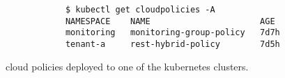 \documentclass[../main.tex]{subfiles}
\begin{document}
    \begin{figure}[h]
        \begin{verbatim}
            $ kubectl get cloudpolicies -A
            NAMESPACE    NAME                      AGE
            monitoring   monitoring-group-policy   7d7h
            tenant-a     rest-hybrid-policy        7d5h
        \end{verbatim}
        \captionsetup{justification=centering}
        \caption{
            \Gls{cloud} policies deployed to one of the \gls{kubernetes} clusters.
        }
        \label{lst:kube_getcpol}
    \end{figure}
\end{document}
